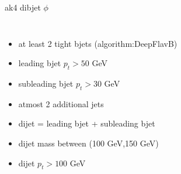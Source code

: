 \documentclass[10pt,xcolor=dvipsnames]{beamer}
\begin{document}
\begin{frame}[fragile]{ak4 dibjet $\phi $ }
\begin{columns}
\begin{itemize}
      \item {at least 2 tight bjets (algorithm:DeepFlavB)}
      \item {leading bjet $p_t > 50 $ GeV}
      \item {subleading bjet $p_t > 30 $ GeV}
      \item {atmost 2 additional jets}
      \item {dijet = leading bjet + subleading bjet}
      \item {dijet mass between (100 GeV,150 GeV)}
      \item {dijet $p_t > 100 $ GeV}
    \end{itemize}
  \end{columns}
\end{frame}

\end{document}
